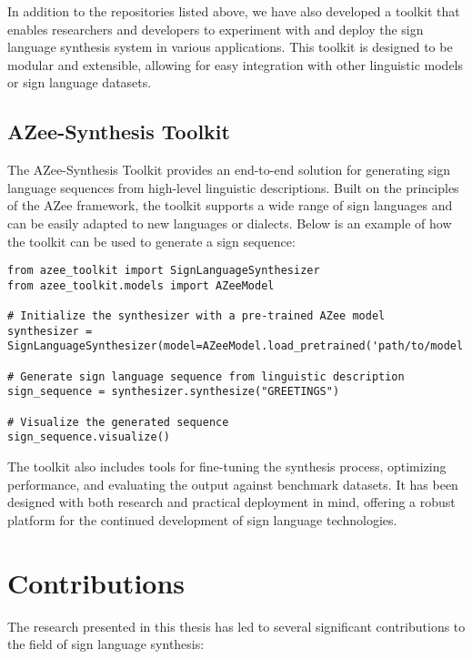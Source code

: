 \documentclass[../../main.tex]{subfiles}
\begin{document}
In addition to the repositories listed above, we have also developed a toolkit that enables researchers and developers to experiment with and deploy the sign language synthesis system in various applications. This toolkit is designed to be modular and extensible, allowing for easy integration with other linguistic models or sign language datasets.

\subsection*{AZee-Synthesis Toolkit}

The AZee-Synthesis Toolkit provides an end-to-end solution for generating sign language sequences from high-level linguistic descriptions. Built on the principles of the AZee framework, the toolkit supports a wide range of sign languages and can be easily adapted to new languages or dialects. Below is an example of how the toolkit can be used to generate a sign sequence:

\begin{verbatim}
from azee_toolkit import SignLanguageSynthesizer
from azee_toolkit.models import AZeeModel

# Initialize the synthesizer with a pre-trained AZee model
synthesizer = SignLanguageSynthesizer(model=AZeeModel.load_pretrained('path/to/model'))

# Generate sign language sequence from linguistic description
sign_sequence = synthesizer.synthesize("GREETINGS")

# Visualize the generated sequence
sign_sequence.visualize()
\end{verbatim}

The toolkit also includes tools for fine-tuning the synthesis process, optimizing performance, and evaluating the output against benchmark datasets. It has been designed with both research and practical deployment in mind, offering a robust platform for the continued development of sign language technologies.

\section{Contributions}
\label{ch:conclusion:contributions}

The research presented in this thesis has led to several significant contributions to the field of sign language synthesis:
\end{document}
